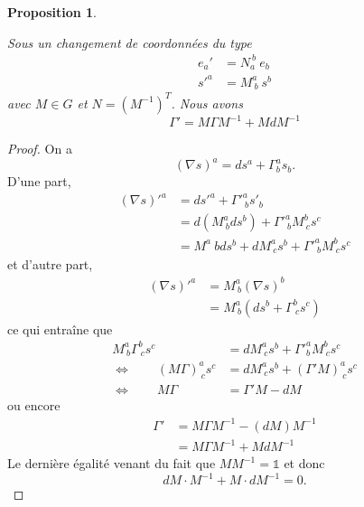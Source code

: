 \documentclass[a4paper,11pt]{report}
\theoremstyle{definition}
\theoremstyle{plain}
\newtheorem{prop}[thm]{Proposition}
\theoremstyle{definition}
\theoremstyle{remark}
\begin{document}
            \begin{prop}\begin{leftbar}
                Sous un changement de coordonnées du type
                \begin{align}
                    e_a' &= N_a^{~b}~e_b \\
                    s'^a &= M^a_{~b} ~s^b
                \end{align}
                 avec $M\in G$ et $N = (M^{-1})^T$. Nous avons
                 \begin{equation}
                     \Gamma' = M\Gamma M^{-1} + MdM^{-1}
                 \end{equation}
            \end{leftbar}\end{prop}
        
            \begin{proof}
                On a 
                \begin{equation}
                    (\nabla s)^a = ds^a + \Gamma^a_b s_b.
                \end{equation}
                D'une part, 
                \begin{align}
                    (\nabla s)'^a &= ds'^a +  \Gamma'^a_{~b} s'_b \\
                    &= d(M^a_{~b} ds^b) + \Gamma'^a_{~b} M^b_{~c}s^c \\
                    &= M^a{~b}ds^b + dM^a_{~c}s^b + \Gamma'^a_{~b} M^b_{~c}s^c
                \end{align}
                et d'autre part,
                \begin{align}
                    (\nabla s)'^a &= M^a_{~b}(\nabla s)^b \\
                    &=  M^a_{~b}\left( ds^b+\Gamma^b_{~c}s^c \right)
                \end{align}
                ce qui entraîne que
                \begin{align}
                     M^a_{~b}\Gamma^b_{~c}s^c &=  dM^a_{~c}s^b + \Gamma'^a_b M^b_{~c}s^c\\
                     \Leftrightarrow \qquad (M\Gamma)^a_{~c}s^c &= dM^a_{~c}s^b + (\Gamma'M)^a_{~c}s^c\\ 
                     \Leftrightarrow \qquad M\Gamma &= \Gamma'M - dM
                \end{align}
                ou encore
                \begin{align}
                    \Gamma' &= M\Gamma M^{-1}-(dM)M^{-1}\\
                    &= M\Gamma M^{-1} + MdM^{-1}
                \end{align}
                Le dernière égalité venant du fait que $MM^{-1} = \mathbb{1}$ et donc 
                \begin{equation}
                    dM\cdot M^{-1} + M\cdot dM^{-1} = 0.
                \end{equation}
            \end{proof}
        
\end{document}
